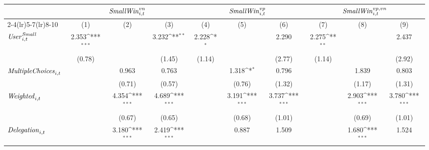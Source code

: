 {
\def\sym#1{\ifmmode^{#1}\else\(^{#1}\)\fi}
\begin{tabular}{l*{9}{c}}
\toprule
                    &\multicolumn{3}{c}{${\it Small Win}^{vn}_{i,t}$}                 &\multicolumn{3}{c}{${\it Small Win}^{vp}_{i,t}$}                 &\multicolumn{3}{c}{${\it Small Win}^{vp,vn}_{i,t}$}              \\\cmidrule(lr){2-4}\cmidrule(lr){5-7}\cmidrule(lr){8-10}
                    &\multicolumn{1}{c}{(1)}         &\multicolumn{1}{c}{(2)}         &\multicolumn{1}{c}{(3)}         &\multicolumn{1}{c}{(4)}         &\multicolumn{1}{c}{(5)}         &\multicolumn{1}{c}{(6)}         &\multicolumn{1}{c}{(7)}         &\multicolumn{1}{c}{(8)}         &\multicolumn{1}{c}{(9)}         \\
\midrule
${\it User}_{i,t}^{\textit{Small}}$&       2.353\sym{***}&                     &       3.232\sym{**} &       2.228\sym{*}  &                     &       2.290         &       2.275\sym{**} &                     &       2.437         \\
                    &      (0.78)         &                     &      (1.45)         &      (1.14)         &                     &      (2.77)         &      (1.14)         &                     &      (2.92)         \\
${\it Multiple Choices}_{i,t}$&                     &       0.963         &       0.763         &                     &       1.318\sym{*}  &       0.796         &                     &       1.839         &       0.803         \\
                    &                     &      (0.71)         &      (0.57)         &                     &      (0.76)         &      (1.32)         &                     &      (1.17)         &      (1.31)         \\
${\it Weighted}_{i,t}$&                     &       4.354\sym{***}&       4.689\sym{***}&                     &       3.191\sym{***}&       3.737\sym{***}&                     &       2.903\sym{***}&       3.780\sym{***}\\
                    &                     &      (0.67)         &      (0.65)         &                     &      (0.68)         &      (1.01)         &                     &      (0.69)         &      (1.01)         \\
${\it Delegation}_{i,t}$&                     &       3.180\sym{***}&       2.419\sym{***}&                     &       0.887         &       1.509         &                     &       1.680\sym{***}&       1.524         \\

\end{tabular}}
